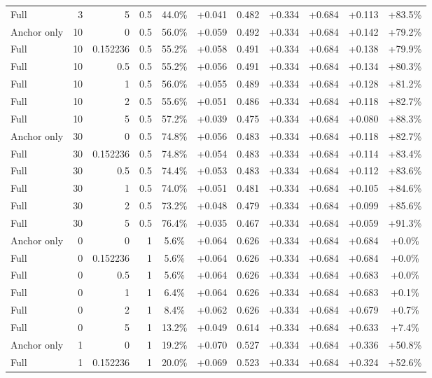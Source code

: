 \begin{table}[htbp]
\begin{tabular}{lrrrccccccc}
Full & 3 & 5 & 0.5 & 44.0\% & +0.041 & 0.482 & +0.334 & +0.684 & +0.113 & +83.5\% \\
Anchor only & 10 & 0 & 0.5 & 56.0\% & +0.059 & 0.492 & +0.334 & +0.684 & +0.142 & +79.2\% \\
Full & 10 & 0.152236 & 0.5 & 55.2\% & +0.058 & 0.491 & +0.334 & +0.684 & +0.138 & +79.9\% \\
Full & 10 & 0.5 & 0.5 & 55.2\% & +0.056 & 0.491 & +0.334 & +0.684 & +0.134 & +80.3\% \\
Full & 10 & 1 & 0.5 & 56.0\% & +0.055 & 0.489 & +0.334 & +0.684 & +0.128 & +81.2\% \\
Full & 10 & 2 & 0.5 & 55.6\% & +0.051 & 0.486 & +0.334 & +0.684 & +0.118 & +82.7\% \\
Full & 10 & 5 & 0.5 & 57.2\% & +0.039 & 0.475 & +0.334 & +0.684 & +0.080 & +88.3\% \\
Anchor only & 30 & 0 & 0.5 & 74.8\% & +0.056 & 0.483 & +0.334 & +0.684 & +0.118 & +82.7\% \\
Full & 30 & 0.152236 & 0.5 & 74.8\% & +0.054 & 0.483 & +0.334 & +0.684 & +0.114 & +83.4\% \\
Full & 30 & 0.5 & 0.5 & 74.4\% & +0.053 & 0.483 & +0.334 & +0.684 & +0.112 & +83.6\% \\
Full & 30 & 1 & 0.5 & 74.0\% & +0.051 & 0.481 & +0.334 & +0.684 & +0.105 & +84.6\% \\
Full & 30 & 2 & 0.5 & 73.2\% & +0.048 & 0.479 & +0.334 & +0.684 & +0.099 & +85.6\% \\
Full & 30 & 5 & 0.5 & 76.4\% & +0.035 & 0.467 & +0.334 & +0.684 & +0.059 & +91.3\% \\
Anchor only & 0 & 0 & 1 & 5.6\% & +0.064 & 0.626 & +0.334 & +0.684 & +0.684 & +0.0\% \\
Full & 0 & 0.152236 & 1 & 5.6\% & +0.064 & 0.626 & +0.334 & +0.684 & +0.684 & +0.0\% \\
Full & 0 & 0.5 & 1 & 5.6\% & +0.064 & 0.626 & +0.334 & +0.684 & +0.683 & +0.0\% \\
Full & 0 & 1 & 1 & 6.4\% & +0.064 & 0.626 & +0.334 & +0.684 & +0.683 & +0.1\% \\
Full & 0 & 2 & 1 & 8.4\% & +0.062 & 0.626 & +0.334 & +0.684 & +0.679 & +0.7\% \\
Full & 0 & 5 & 1 & 13.2\% & +0.049 & 0.614 & +0.334 & +0.684 & +0.633 & +7.4\% \\
Anchor only & 1 & 0 & 1 & 19.2\% & +0.070 & 0.527 & +0.334 & +0.684 & +0.336 & +50.8\% \\
Full & 1 & 0.152236 & 1 & 20.0\% & +0.069 & 0.523 & +0.334 & +0.684 & +0.324 & +52.6\% \\

\end{tabular}
\end{table}
